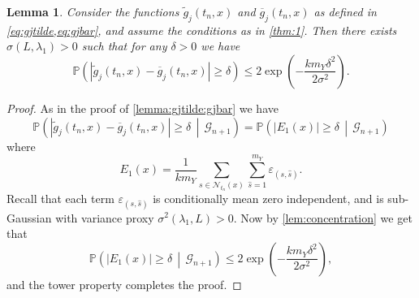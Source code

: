 \documentclass[11pt,reqno,a4paper]{amsart}
\newtheorem{lemma}[theorem]{Lemma}
\theoremstyle{definition}
\numberwithin{equation}{section}
\newcommand{\Mid}{\,\middle\vert \,}
\newcommand{\widebar}[1]{\overline{#1}}
\renewcommand{\P}{\mathbb{P}}
\DeclareMathOperator{\1}{\mathbbm{1}}
\begin{document}
\begin{lemma} \label{lemma:gjtilde:gjbar:2}
  Consider the functions $\widetilde{g}_j(t_n,x)$ and $\widebar{g}_j(t_n,x)$ as defined in \cref{eq:gjtilde,eq:gjbar}, and assume the conditions as in \cref{thm:1}.
  Then there exists $\sigma(L, \lambda_1) > 0$ such that for any $\delta > 0$ we have
  \begin{equation*}
    \P \left (|\widetilde{g}_j(t_n,x) - \widebar{g}_j(t_n,x)| \geq \delta \right ) \leq 2 \exp \left (-\frac{k m_Y \delta^2}{2 \sigma^2} \right ).
  \end{equation*}
\end{lemma}
\begin{proof}
  As in the proof of \cref{lemma:gjtilde:gjbar} we have
  \begin{equation*}
    \P \left (|\widetilde{g}_j(t_n,x) - \widebar{g}_j(t_n,x)| \geq \delta \Mid \mathcal{G}_{n+1} \right ) =
    \P \left ( |E_1(x)| \geq \delta \Mid \mathcal{G}_{n+1} \right )
  \end{equation*}
  where
  \begin{equation*}
    E_1(x) = \frac{1}{k m_Y} \sum_{s \in \mathcal{N}_{t_n}(x)} \sum_{\hat s=1}^{m_Y} \varepsilon_{(s,\hat s)}.
  \end{equation*}
  Recall that each term $\varepsilon_{(s,\hat s)}$ is conditionally mean zero independent, and is sub-Gaussian with variance proxy $\sigma^2(\lambda_1, L) > 0$. Now by \cref{lem:concentration} we get that
  \begin{equation*}
    \P \left ( |E_1(x)| \geq \delta \Mid \mathcal{G}_{n+1} \right ) \leq 2 \exp \left (-\frac{k m_Y \delta^2}{2 \sigma^2} \right ),
  \end{equation*}
  and the tower property completes the proof.
\end{proof}
\end{document}

